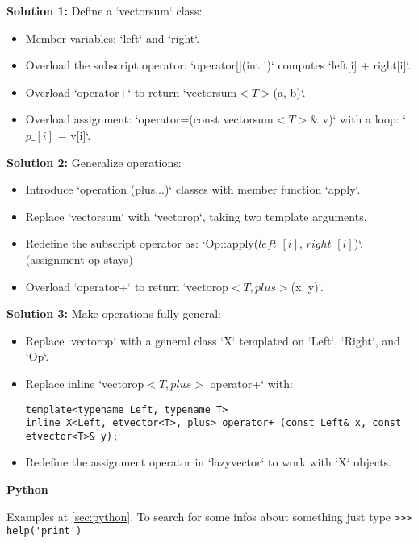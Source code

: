 \documentclass[fontsize=8pt, a4paper, landscape, fleqn]{scrartcl}
\renewcommand{\section}[1]{%
    \noindent\colorbox{sectioncolor}{%
        \parbox{\dimexpr\columnwidth-2\fboxsep}{\color{white}\textbf{#1}}}%
    \vspace{0.5mm}%
}
\begin{document}
\begin{multicols*}{3}[\raggedcolumns]
\textbf{Solution 1:} Define a `vectorsum` class:
\begin{itemize}
    \item Member variables: `left` and `right`.
    \item Overload the subscript operator: `operator[](int i)` computes `left[i] + right[i]`.
    \item Overload `operator+` to return `vectorsum$<T>$(a, b)`.
    \item Overload assignment: `operator=(const vectorsum$<T>\&$ v)` with a loop: `$p\_[i]$ = v[i]`.
\end{itemize}

\textbf{Solution 2:} Generalize operations:
\begin{itemize}
    \item Introduce `operation (plus,..)` classes with member function `apply`.
    \item Replace `vectorsum` with `vectorop`, taking two template arguments.
    \item Redefine the subscript operator as: `Op::apply($left\_[i]$, $right\_[i]$)`. (assignment op stays)
    \item Overload `operator+` to return `vectorop$<T, plus>$(x, y)`.
\end{itemize}

\textbf{Solution 3:} Make operations fully general:
\begin{itemize}
    \item Replace `vectorop` with a general class `X` templated on `Left`, `Right`, and `Op`.
    \item Replace inline `vectorop$<T, plus>$ operator+` with:
    \begin{verbatim}
template<typename Left, typename T>
inline X<Left, etvector<T>, plus> operator+ (const Left& x, const etvector<T>& y);
    \end{verbatim}
    \item Redefine the assignment operator in `lazyvector` to work with `X` objects.
\end{itemize}

    \section{Python}
    Examples at \colorbox{green!7}{\autoref{sec:python}}. To search for some infos about something just type \lstinline{>>> help('print')}
    

\end{multicols*}
\end{document}
